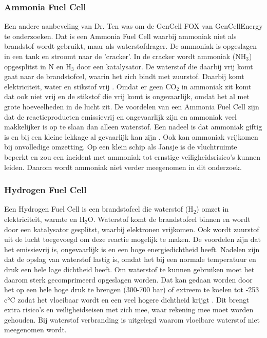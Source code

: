 \subsubsection{\textbf{Ammonia Fuel Cell}}
Een andere aanbeveling van Dr. Ten was om de GenCell FOX van GenCellEnergy te onderzoeken. Dat is een Ammonia Fuel Cell waarbij ammoniak niet als brandstof wordt gebruikt, maar als waterstofdrager. De ammoniak is opgeslagen in een tank en stroomt naar de 'cracker'. In de cracker wordt ammoniak (NH$_3$) opgesplitst in N en H$_3$ door een katalysator. De waterstof die daarbij vrij komt gaat naar de brandstofcel, waarin het zich bindt met zuurstof. Daarbij komt elektriciteit, water en stikstof vrij \cite{GenCellFOXVideo}. Omdat er geen CO$_2$ in ammoniak zit komt dat ook niet vrij en de stikstof die vrij komt is ongevaarlijk, omdat het al met grote hoeveelheden in de lucht zit. De voordelen van een Ammonia Fuel Cell zijn dat de reactieproducten emissievrij en ongevaarlijk zijn en ammoniak veel makkelijker is op te slaan dan alleen waterstof. Een nadeel is dat ammoniak giftig is en bij een kleine lekkage al gevaarlijk kan zijn \cite{NIPVAmmoniakincidenten} \label{Ammoniakgiftig}. Ook kan ammoniak vrijkomen bij onvolledige omzetting. Op een klein schip als Jansje is de vluchtruimte beperkt en zou een incident met ammoniak tot ernstige veiligheidsrisico's kunnen leiden. Daarom wordt ammoniak niet verder meegenomen in dit onderzoek.

\subsubsection{\textbf{Hydrogen Fuel Cell}}
Een Hydrogen Fuel Cell is een brandstofcel die waterstof (H$_2$) omzet in elektriciteit, warmte en H$_2$O. Waterstof komt de brandstofcel binnen en wordt door een katalysator gesplitst, waarbij elektronen vrijkomen. Ook wordt zuurstof uit de lucht toegevoegd om deze reactie mogelijk te maken. De voordelen zijn dat het emissievrij is, ongevaarlijk is en een hoge energiedichtheid heeft. Nadelen zijn dat de opslag van waterstof lastig is, omdat het bij een normale temperatuur en druk een hele lage dichtheid heeft. Om waterstof te kunnen gebruiken moet het daarom sterk gecomprimeerd opgeslagen worden. Dat kan gedaan worden door het op een hele hoge druk te brengen (300-700 bar) of extreem te koelen tot -253 c°C zodat het vloeibaar wordt en een veel hogere dichtheid krijgt \cite{EngineeringToolboxHydrogen}. Dit brengt extra risico's en veiligheidseisen met zich mee, waar rekening mee moet worden gehouden. Bij waterstof verbranding is uitgelegd waarom vloeibare waterstof niet meegenomen wordt. 

